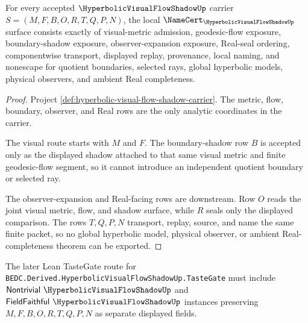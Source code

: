 \begin{theorem}
\label{thm:hyperbolic-visual-flow-shadow-obligation}
For every accepted $\HyperbolicVisualFlowShadowUp$ carrier $S=(M,F,B,O,R,T,Q,P,N)$, the local $\NameCert_{\HyperbolicVisualFlowShadowUp}$ surface consists exactly of visual-metric admission, geodesic-flow exposure, boundary-shadow exposure, observer-expansion exposure, Real-seal ordering, componentwise transport, displayed replay, provenance, local naming, and nonescape for quotient boundaries, selected rays, global hyperbolic models, physical observers, and ambient Real completeness.
\end{theorem}
\begin{proof}
Project \autoref{def:hyperbolic-visual-flow-shadow-carrier}. The metric, flow, boundary, observer, and Real rows are the only analytic coordinates in the carrier.

The visual route starts with $M$ and $F$. The boundary-shadow row $B$ is accepted only as the displayed shadow attached to that same visual metric and finite geodesic-flow segment, so it cannot introduce an independent quotient boundary or selected ray.

The observer-expansion and Real-facing rows are downstream. Row $O$ reads the joint visual metric, flow, and shadow surface, while $R$ seals only the displayed comparison. The rows $T,Q,P,N$ transport, replay, source, and name the same finite packet, so no global hyperbolic model, physical observer, or ambient Real-completeness theorem can be exported.
\end{proof}



The later Lean TasteGate route for \texttt{BEDC.Derived.HyperbolicVisualFlowShadowUp.TasteGate} must include $\mathsf{Nontrivial}\ \HyperbolicVisualFlowShadowUp$ and $\mathsf{FieldFaithful}\ \HyperbolicVisualFlowShadowUp$ instances preserving $M,F,B,O,R,T,Q,P,N$ as separate displayed fields.

